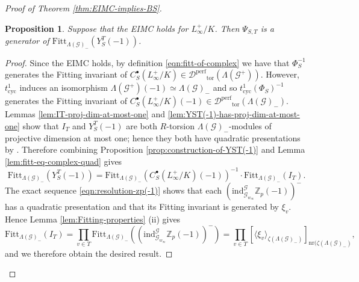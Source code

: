 \documentclass[12pt]{amsart}
\theoremstyle{plain}
\newtheorem{prop}[theorem]{Proposition}
\theoremstyle{remark}
\theoremstyle{definition}
\numberwithin{equation}{section}
\begin{document}
{\begin{proof}[Proof of Theorem \ref{thm:EIMC-implies-BS}]
\begin{prop}\label{prop:EIMC-gives-Fitting}
Suppose that the EIMC holds for $L_{\infty}^{+}/K$. 
Then $\Psi_{S,T}$ is a generator of ${\mathrm{Fitt}}_{\Lambda(\mathcal{G})_{-}}(Y_{S}^{T} (-1))$.
\end{prop}

\begin{proof}
Since the EIMC holds, by definition \eqref{eqn:fitt-of-complex} we have that 
$\Phi_{S}^{-1}$ generates the Fitting invariant of $C_{S}^{\bullet}(L_{\infty}^{+}/K) \in \mathcal{D}^{\mathrm{perf}}{_{\mathrm{tor}}}(\Lambda(\mathcal{G}^{+}))$.
However, $t_{\mathrm{cyc}}^{1}$ induces an isomorphism $\Lambda(\mathcal{G}^{+})(-1) \simeq \Lambda(\mathcal{G})_{-}$ and so 
$t_{\mathrm{cyc}}^{1}(\Phi_{S})^{-1}$ generates the Fitting invariant of $C_{S}^{\bullet}(L_{\infty}^{+}/K)(-1) \in \mathcal{D}^{\mathrm{perf}}{_{\mathrm{tor}}}(\Lambda(\mathcal{G})_{-})$.
Lemmas \ref{lem:IT-proj-dim-at-most-one} and \ref{lem:YST(-1)-has-proj-dim-at-most-one} show that 
$I_{T}$ and $Y_{S}^{T} (-1)$ are both $R$-torsion $\Lambda(\mathcal{G})_{-}$-modules of projective dimension at most one; 
hence they both have quadratic presentations by \cite[Lemma 6.2]{MR2609173}.
Therefore combining Proposition \ref{prop:construction-of-YST(-1)}
and Lemma \ref{lem:fitt-eq-complex-quad} gives
\[
{\mathrm{Fitt}}_{\Lambda(\mathcal{G})_{-}}(Y_{S}^{T} (-1))  =  {\mathrm{Fitt}}_{\Lambda(\mathcal{G})_{-}}\left(C_{S}^{\bullet}(L_{\infty}^{+}/K)(-1)\right)^{-1}
\cdot {\mathrm{Fitt}}_{\Lambda(\mathcal{G})_{-}} (I_{T}).
\]
The exact sequence \eqref{eqn:resolution-zp(-1)} shows that each $({\mathrm{ind}}_{\mathcal{G}_{w_{\infty}}}^{\mathcal{G}} {\mathbb{Z}}_{p}(-1))^{-}$
has a quadratic presentation and that its Fitting invariant is generated by $\xi_{v}$.
Hence Lemma \ref{lem:Fitting-properties} (ii) gives
\[
{\mathrm{Fitt}}_{\Lambda(\mathcal{G})_{-}}(I_{T}) = 
\prod_{v\in T} {\mathrm{Fitt}}_{\Lambda(\mathcal{G})_{-}}\left(({\mathrm{ind}}_{\mathcal{G}_{w_{\infty}}}^{\mathcal{G}} {\mathbb{Z}}_{p}(-1))^{-}\right) = 
\prod_{v \in T} \left[ \langle  \xi_{v} \rangle_{\zeta(\Lambda(\mathcal{G})_{-})}\right]_{{\mathrm{nr}}(\zeta(\Lambda(\mathcal{G})_{-})},
\]
and we therefore obtain the desired result.
\end{proof}


\end{proof}}
\end{document}
